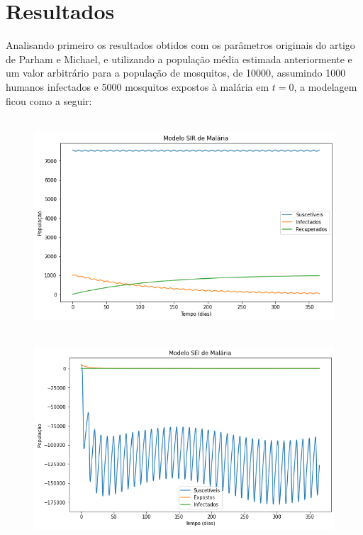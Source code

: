 \documentclass[12pt]{article}
\begin{document}
\newpage
\section{Resultados}

Analisando primeiro os resultados obtidos com os parâmetros originais do artigo de Parham e Michael, e utilizando a população média estimada anteriormente e um valor arbitrário para a população de mosquitos, de 10000, assumindo 1000 humanos infectados e 5000 mosquitos expostos à malária em $t=0$, a modelagem ficou como a seguir: 

\begin{figure}[!ht]
        \centering
        \hbox{\hspace{0.0em} \includegraphics[scale=0.55] {SIR_Dados_Originais_Parham_Michael.png}}
\end{figure} 
\newpage
\begin{figure}[!ht]
        \centering
        \hbox{\hspace{0.0em} \includegraphics[scale=0.55] {SEI_Dados_Originais_Parham_Michael.png}}
\end{figure} 
\end{document}
